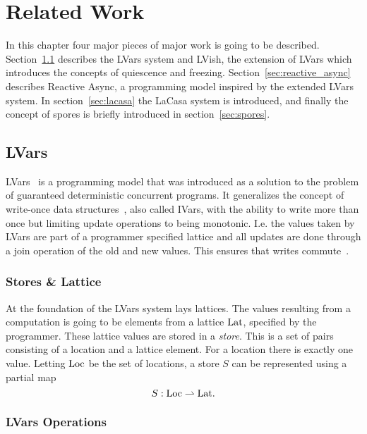 \chapter{Related Work}\label{cha:related_work}

In this chapter four major pieces of major work is going to be described.
Section~\ref{sec:lvars} describes the LVars system and LVish, the extension
of LVars which introduces the concepts of quiescence and freezing. 
Section~\ref{sec:reactive_async} describes Reactive Async, a programming model
inspired by the extended LVars system. In section~\ref{sec:lacasa} the LaCasa
system is introduced, and finally the concept of spores is briefly introduced in
section~\ref{sec:spores}.

\section{LVars}\label{sec:lvars}

LVars~\parencite{kuper2013lvars} is a programming model that was introduced as a
solution to the problem of guaranteed deterministic concurrent programs. It
generalizes the concept of write-once data
structures~\parencite{nikhil1989structures}, also called IVars, with the ability
to write more than once but limiting update operations to being monotonic. I.e.
the values taken by LVars are part of a programmer specified lattice and all
updates are done through a join operation of the old and new values. This
ensures that writes commute~\parencite{kuper2013lvars}.

\subsection{Stores \& Lattice}%
\label{sub:stores_and_lattice}

At the foundation of the LVars system lays lattices. The values resulting from a
computation is going to be elements from a lattice $\mathrm{Lat}$, specified by the
programmer. These lattice values are stored in a \emph{store}.  This is a set of
pairs consisting of a location and a lattice element. For a location there is
exactly one value. Letting $\mathrm{Loc}$ be the set of locations, a store $S$ can
be represented using a partial map
\begin{equation*}
  S: \mathrm{Loc} \rightharpoonup \mathrm{Lat}.
\end{equation*}

\subsection{LVars Operations}%
\label{sub:lvars_operations}

